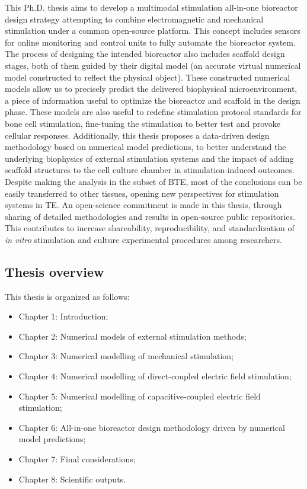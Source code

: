 This Ph.D. thesis aims to develop a multimodal stimulation all-in-one bioreactor design strategy attempting to combine electromagnetic and mechanical stimulation under a common open-source platform. This concept includes sensors for online monitoring and control units to fully automate the bioreactor system. The process of designing the intended bioreactor also includes scaffold design stages, both of them guided by their digital model (an accurate virtual numerical model constructed to reflect the physical object). These constructed numerical models allow us to precisely predict the delivered biophysical microenvironment, a piece of information useful to optimize the bioreactor and scaffold in the design phase. These models are also useful to redefine stimulation protocol standards for bone cell stimulation, fine-tuning the stimulation to better test and provoke cellular responses. Additionally, this thesis proposes a data-driven design methodology based on numerical model predictions, to better understand the underlying biophysics of external stimulation systems and the impact of adding scaffold structures to the cell culture chamber in stimulation-induced outcomes. Despite making the analysis in the subset of \ac{BTE}, most of the conclusions can be easily transferred to other tissues, opening new perspectives for stimulation systems in \ac{TE}. An open-science commitment is made in this thesis, through sharing of detailed methodologies and results in open-source public repositories. This contributes to increase shareability, reproducibility, and standardization of \textit{in vitro} stimulation and culture experimental procedures among researchers.

\subsection{Thesis overview}
This thesis is organized as follows:
\begin{itemize}
\item Chapter 1: Introduction;
\item Chapter 2: Numerical models of external stimulation methods;
\item Chapter 3: Numerical modelling of mechanical stimulation;
\item Chapter 4: Numerical modelling of direct-coupled electric field stimulation;
\item Chapter 5: Numerical modelling of capacitive-coupled electric field stimulation;
\item Chapter 6: All-in-one bioreactor design methodology driven by numerical model predictions;
\item Chapter 7: Final considerations;
\item Chapter 8: Scientific outputs.
\end{itemize}


% 
%
%